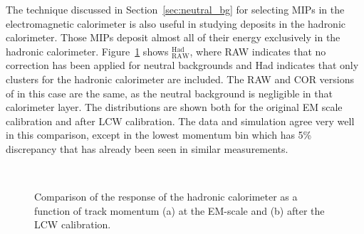 The technique discussed in Section~\ref{sec:neutral_bg} for selecting \ac{MIP}s in the electromagnetic calorimeter is also useful in studying deposits in the hadronic calorimeter.
Those \ac{MIP}s deposit almost all of their energy exclusively in the hadronic calorimeter.
Figure~\ref{fig:epav_hcal} shows \epav$_\mathrm{RAW}^\mathrm{Had}$, where RAW indicates that no correction has been applied for neutral backgrounds and Had indicates that only clusters for the hadronic calorimeter are included.
The RAW and COR versions of \epav in this case are the same, as the neutral background is negligible in that calorimeter layer.
The distributions are shown both for the original EM scale calibration and after LCW calibration.
The data and simulation agree very well in this comparison, except in the lowest momentum bin which has 5\% discrepancy that has already been seen in similar measurements.

\begin{figure}[h]
\centering
{}
~
\caption{Comparison of the response of the hadronic calorimeter as a function of track momentum (a) at the EM-scale and (b) after the LCW calibration.}
\label{fig:epav_hcal}
\end{figure}

